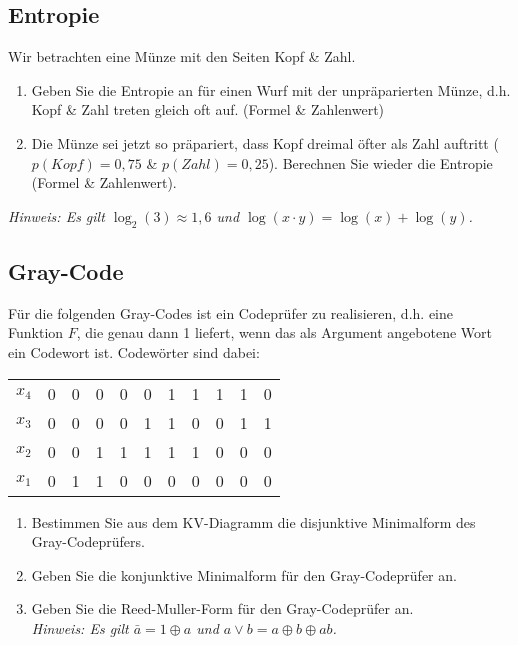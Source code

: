 \documentclass{exercisesheet}
\begin{document}
    \subsection{Entropie}
      Wir betrachten eine Münze mit den Seiten Kopf \& Zahl.
      \begin{enumerate}
        \item Geben Sie die Entropie an für einen Wurf mit der unpräparierten Münze, d.h. Kopf \& Zahl treten gleich oft auf. (Formel \& Zahlenwert)
        \item Die Münze sei jetzt so präpariert, dass Kopf dreimal öfter als Zahl auftritt ($p(Kopf) = 0,75$ \& $p(Zahl) = 0,25$). Berechnen Sie wieder die Entropie (Formel \& Zahlenwert).
      \end{enumerate}
      \textit{Hinweis: Es gilt $\log_2(3) \approx 1,6$ und $\log(x \cdot y) = \log(x) + \log(y)$.}

    \subsection{Gray-Code}
      Für die folgenden Gray-Codes ist ein Codeprüfer zu realisieren, d.h. eine Funktion $F$, die genau dann 1 liefert, wenn das als Argument angebotene Wort ein Codewort ist. Codewörter sind dabei:

      \begin{center}
        \begin{tabular}{c|cccc cccc cc}
          $x_4$ & 0 & 0 & 0 & 0 & 0 & 1 & 1 & 1 & 1 & 0\\
          $x_3$ & 0 & 0 & 0 & 0 & 1 & 1 & 0 & 0 & 1 & 1\\
          $x_2$ & 0 & 0 & 1 & 1 & 1 & 1 & 1 & 0 & 0 & 0\\
          $x_1$ & 0 & 1 & 1 & 0 & 0 & 0 & 0 & 0 & 0 & 0\\
        \end{tabular}
      \end{center}

      \begin{enumerate}
        \item Bestimmen Sie aus dem KV-Diagramm die disjunktive Minimalform des Gray-Codeprüfers.
        \item Geben Sie die konjunktive Minimalform für den Gray-Codeprüfer an.
        \item Geben Sie die Reed-Muller-Form für den Gray-Codeprüfer an.\\\textit{Hinweis: Es gilt $\bar{a}=1\oplus a$ und $a\lor b = a\oplus b\oplus ab$.}
      \end{enumerate}
\end{document}
